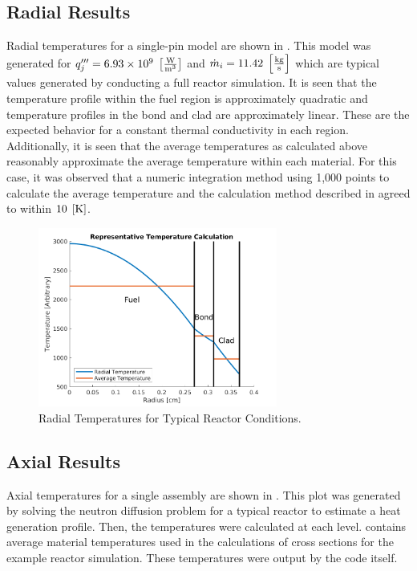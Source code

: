   \subsection{Radial Results}
    Radial temperatures for a single-pin model are shown in
    . This model was generated for 
    $q'''_j = 6.93 \times 10^9 \;\left[\text{{$\frac{\text{W}}{\text{m}^3}$}}\right]$ and 
    $\dot{m}_i = 11.42 \;\left[\text{{$\frac{\text{kg}}{\text{s}}$}}\right]$ which are typical 
    values generated by conducting a full reactor simulation. It is seen
    that the temperature profile within the fuel region is approximately 
    quadratic and temperature profiles in the bond and clad are approximately
    linear. These are the expected behavior for a constant thermal conductivity
    in each region. Additionally, it is seen that the average temperatures as
    calculated above reasonably approximate the average temperature within each
    material. For this case, it was observed that a numeric integration method
    using 1,000 points to calculate the average temperature and the calculation
    method described in  agreed to within 
    $10 \;\left[\text{{K}}\right]$.

    \begin{figure}
      \centering
      \includegraphics[width=0.7\textwidth]{radial_temp_plot}
      \caption{Radial Temperatures for Typical Reactor Conditions.}
      \label{fig:radial_temp_plot}
    \end{figure}

  \subsection{Axial Results}
    Axial temperatures for a single assembly are shown in
    . This plot was generated by solving the neutron
    diffusion problem for a typical reactor to estimate a heat generation
    profile. Then, the temperatures were calculated at each level.
     contains average material temperatures used in
    the calculations of cross sections for the example reactor simulation. These
    temperatures were output by the code itself.

